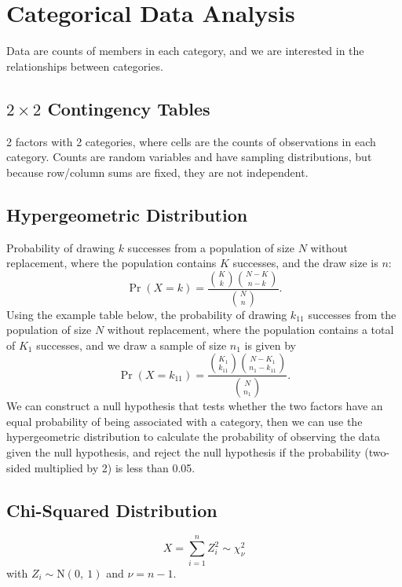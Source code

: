 \documentclass{article}
\begin{document}
\section{Categorical Data Analysis}
Data are counts of members in each category, and we are interested in the relationships between categories.
\begin{multicols}{3}
    \subsection{\texorpdfstring{\(2 \times 2\)}{2x2} Contingency Tables}
    2 factors with 2 categories, where cells are the counts of observations in each category.
    Counts are random variables and have sampling distributions, but because row/column sums are fixed, they are not
independent.
\subsection{Hypergeometric Distribution}
Probability of drawing \(k\) successes from a population of size \(N\) without replacement,
where the population contains \(K\) successes, and the draw size is \(n\):
\begin{equation*}
    \Pr{\left( X = k \right)} = \frac{\binom{K}{k} \binom{N - K}{n - k}}{\binom{N}{n}}.
\end{equation*}
Using the example table below,
the probability of drawing \(k_{11}\) successes from the population of size \(N\) without replacement, where the population contains a total of
\(K_1\) successes, and we draw a sample of size \(n_1\) is given by
\begin{equation*}
    \Pr{\left( X = k_{11} \right)} = \frac{\binom{K_1}{k_{11}} \binom{N - K_1}{n_1 - k_{11}}}{\binom{N}{n_1}}.
\end{equation*}
We can construct a null hypothesis that tests whether the two factors have an equal probability of being
associated with a category, then we can use the hypergeometric distribution to calculate the probability of
observing the data given the null hypothesis, and reject the null hypothesis if the probability (two-sided multiplied by 2)
is less than 0.05.
\subsection{Chi-Squared Distribution}
\begin{equation*}
    X = \sum_{i = 1}^n Z_i^2 \sim \chi_\nu^2
\end{equation*}
with \(Z_i \sim \mathrm{N}\left( 0,\: 1 \right)\) and \(\nu = n - 1\).

\end{multicols}
\end{document}
